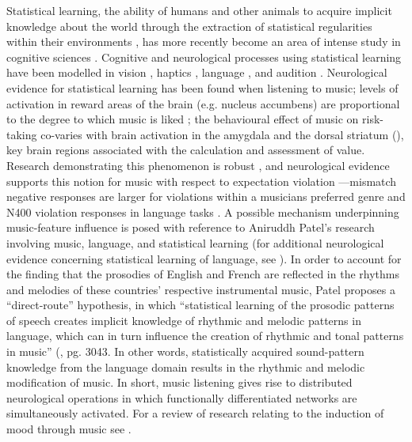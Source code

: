 \documentclass[a4paper]{article}
\begin{document}
Statistical learning, the ability of humans and other animals to acquire implicit knowledge about the world through the extraction of statistical regularities within their environments \cite{friedman2001elements}, has more recently become an area of intense study in cognitive sciences \cite{tenenbaum2011grow}. Cognitive and neurological processes using statistical learning have been modelled in vision \cite{kirkham2002visual,conway2005modality,turk2008multidimensional}, haptics \cite{conway2005modality,goldreich2007bayesian,ernst2002humans}, language \cite{conway2010implicit}, and audition \cite{conway2005modality,saffran1999statistical}. Neurological evidence for statistical learning has been found when listening to music; levels of activation in reward areas of the brain (e.g. nucleus accumbens) are proportional to the degree to which music is liked \cite{berns2010neural}; the behavioural effect of music on risk-taking co-varies with brain activation in the amygdala and the dorsal striatum (\cite{halko2015hedonic}), key brain regions associated with the calculation and assessment of value. Research demonstrating this phenomenon is robust \cite{huron2003agogic, patel2003empirical, daniele2004interplay}, and neurological evidence supports this notion for music with respect to expectation violation \cite{pearce2010unsupervised}---mismatch negative responses are larger for violations within a musicians preferred genre \cite{brattico2009neural} and N400 violation responses in language tasks \cite{koelsch2004music}. A possible mechanism underpinning music-feature influence is posed with reference to Aniruddh Patel’s research involving music, language, and statistical learning (for additional neurological evidence concerning statistical learning of language, see \cite{cheour1998development, rivera2005neural}). In order to account for the finding that the prosodies of English and French are reflected in the rhythms and melodies of these countries' respective instrumental music, Patel proposes a “direct-route” hypothesis, in which “statistical learning of the prosodic patterns of speech creates implicit knowledge of rhythmic and melodic patterns in language, which can in turn influence the creation of rhythmic and tonal patterns in music” (\cite{patel2006comparing}, pg. 3043. In other words, statistically acquired sound-pattern knowledge from the language domain results in the rhythmic and melodic modification of music. In short, music listening gives rise to distributed neurological operations in which functionally differentiated networks are simultaneously activated. For a review of research relating to the induction of mood through music see \cite{vastfjall2002emotion}. 
\end{document}
